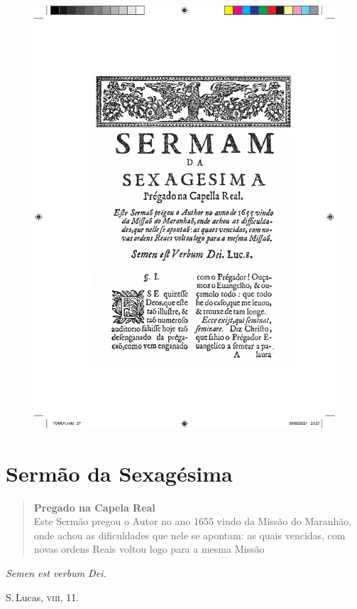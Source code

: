 \pagebreak
\thispagestyle{empty}
\movetoevenpage
\begin{figure}
\includegraphics[width=\textwidth]{./imgs/sexagesima.pdf}  
\end{figure}

\chapter{Sermão da Sexagésima}


\begin{quotation}
\noindent\textbf{Pregado na Capela Real}\\
Este Sermão pregou o Autor no ano 1655 vindo da Missão do Maranhão,
onde achou as dificuldades que nele se apontam: as quais vencidas, com novas ordens Reais voltou logo para a mesma Missão
\end{quotation}


\epigraph{\textit{Semen est verbum Dei.\footnotemark}}{ S.\,Lucas, \textsc{viii}, 11.}


